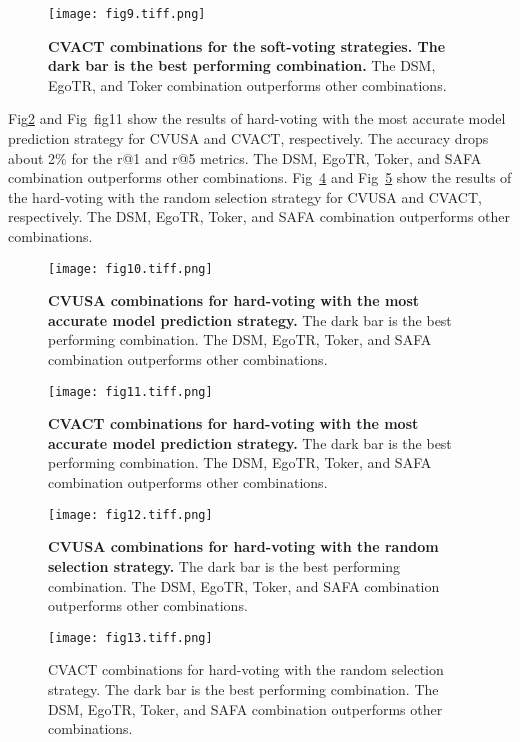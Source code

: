 \documentclass[10pt,letterpaper]{article}
\begin{document}
\begin{figure}[!h]
  \caption{{\bf CVACT combinations for the soft-voting strategies. The dark bar is the best performing combination.} The DSM, EgoTR, and Toker combination outperforms other combinations. }
  
  \texttt{[image: fig9.tiff.png]}
  \label{fig9}
\end{figure}

Fig\ref{fig10} and Fig~{fig11} show the results of hard-voting with the most accurate model prediction strategy for CVUSA and CVACT, respectively. The accuracy drops about 2\% for the r@1 and r@5 metrics. The DSM, EgoTR, Toker, and SAFA combination outperforms other combinations. Fig~\ref{fig12} and Fig~\ref{fig13} show the results of the hard-voting with the random selection strategy for CVUSA and CVACT, respectively. The DSM, EgoTR, Toker, and SAFA combination outperforms other combinations.


\begin{figure}[!h]
  \caption{{\bf CVUSA combinations for hard-voting with the most accurate model prediction strategy.} The dark bar is the best performing combination. The DSM, EgoTR, Toker, and SAFA combination outperforms other combinations.}
  \texttt{[image: fig10.tiff.png]}
  \label{fig10}
\end{figure}

\begin{figure}[!h]
  \caption{{\bf CVACT combinations for hard-voting with the most accurate  model prediction strategy.} The dark bar is the best performing combination. The DSM, EgoTR, Toker, and SAFA combination outperforms other combinations.}
  
  \texttt{[image: fig11.tiff.png]}
  \label{fig11}
\end{figure}

\begin{figure}[!h]
  \caption{{\bf CVUSA combinations for hard-voting with the random selection strategy.} The dark bar is the best performing combination. The DSM, EgoTR, Toker, and SAFA combination outperforms other combinations. }
  \texttt{[image: fig12.tiff.png]}
  \label{fig12}
\end{figure}

\begin{figure}[!h]
  \caption{{ CVACT combinations for hard-voting with the random selection strategy.}   The dark bar is the best performing combination. The DSM, EgoTR, Toker, and SAFA combination outperforms other combinations.}
  \texttt{[image: fig13.tiff.png]}
  \label{fig13}
\end{figure}
\end{document}

